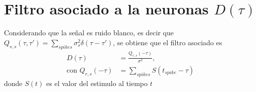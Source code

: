 \section*{Filtro asociado a la neuronas \texorpdfstring{$D(\tau)$}{}}


Considerando que la señal es ruido blanco, es decir que $Q_{s,s}(\tau, \tau')= \sum_{spikes} \sigma^2_s \delta(\tau-\tau')$, se obtiene que el filtro asociado es 
\begin{align}
    D(\tau) &= \frac{Q_{r,s}(-\tau)}{\sigma^2}, \\
    \text{con } Q_{r,s}(-\tau) &= \sum_{spikes} S(t_{spike} - \tau)
\end{align}
donde $S(t)$ es el valor del estimulo al tiempo $t$




